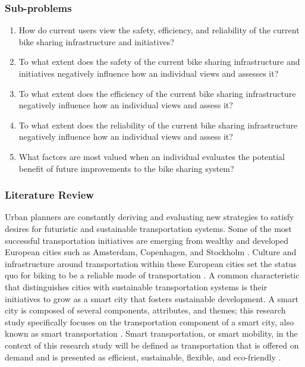 \documentclass[12pt]{article}
\begin{document}
\subsubsection*{Sub-problems}
\begin{enumerate}
    \item How do current users view the safety, efficiency, and reliability of the current bike sharing infrastructure and initiatives?
    \item To what extent does the safety of the current bike sharing infrastructure and initiatives negatively influence how an
    individual views and assesses it?
    \item To what extent does the efficiency of the current bike sharing infrastructure negatively influence how an
    individual views and assess it?
    \item To what extent does the reliability of the current bike sharing infrastructure negatively influence how an
    individual views and assess it?
    \item What factors are most valued when an individual evaluates the potential benefit of future improvements to the bike sharing system?
\end{enumerate}
\medskip
\subsubsection*{Literature Review}
Urban planners are constantly deriving and evaluating new strategies to satisfy desires for futuristic and sustainable 
transportation systems. Some of the most successful transportation initiatives are emerging from wealthy and developed 
European cities such as Amsterdam, Copenhagen, and Stockholm \cite{DeliotteReport}. Culture and infrastructure around transportation 
within these European cities set the status quo for biking to be a reliable mode of transportation \cite{DeliotteReport}.  A common characteristic 
that distinguishes cities with sustainable transportation systems is their initiatives to grow as a smart city that 
fosters sustainable development. A smart city is composed of several components, attributes, and themes; this research study 
specifically focuses on the transportation component of a smart city, also known as smart transportation \cite{DefiningSmartCity}. 
Smart transportation, or smart mobility, in the context of this research study will be defined as transportation that is offered on demand
and is presented as efficient, sustainable, flexible, and eco-friendly \cite{SmartTransportation}. 
\end{document}
